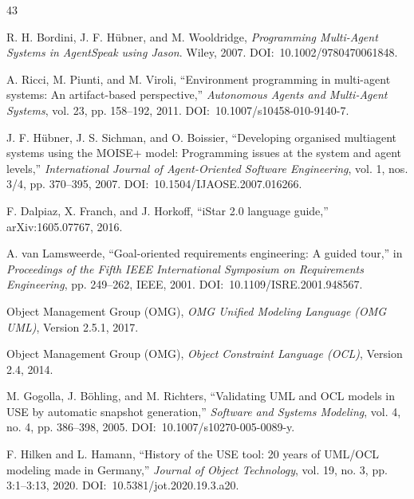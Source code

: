 \documentclass[12pt,a4paper,oneside]{extreport}
\begin{document}
\begin{thebibliography}{43}

R. H. Bordini, J. F. Hübner, and M. Wooldridge, \emph{Programming Multi-Agent Systems in AgentSpeak using Jason}. Wiley, 2007. \mbox{DOI: 10.1002/9780470061848}.


A. Ricci, M. Piunti, and M. Viroli, ``Environment programming in multi-agent systems: An artifact-based perspective,'' \emph{Autonomous Agents and Multi-Agent Systems}, vol. 23, pp. 158--192, 2011. \mbox{DOI: 10.1007/s10458-010-9140-7}.


J. F. Hübner, J. S. Sichman, and O. Boissier, ``Developing organised multiagent systems using the MOISE+ model: Programming issues at the system and agent levels,'' \emph{International Journal of Agent-Oriented Software Engineering}, vol. 1, nos. 3/4, pp. 370--395, 2007. \mbox{DOI: 10.1504/IJAOSE.2007.016266}.


F. Dalpiaz, X. Franch, and J. Horkoff, ``iStar 2.0 language guide,'' arXiv:1605.07767, 2016.


A. van Lamsweerde, ``Goal-oriented requirements engineering: A guided tour,'' in \emph{Proceedings of the Fifth IEEE International Symposium on Requirements Engineering}, pp. 249--262, IEEE, 2001. \mbox{DOI: 10.1109/ISRE.2001.948567}.


Object Management Group (OMG), \emph{OMG Unified Modeling Language (OMG UML)}, Version 2.5.1, 2017.


Object Management Group (OMG), \emph{Object Constraint Language (OCL)}, Version 2.4, 2014.


M. Gogolla, J. Böhling, and M. Richters, ``Validating UML and OCL models in USE by automatic snapshot generation,'' \emph{Software and Systems Modeling}, vol. 4, no. 4, pp. 386--398, 2005. \mbox{DOI: 10.1007/s10270-005-0089-y}.


F. Hilken and L. Hamann, ``History of the USE tool: 20 years of UML/OCL modeling made in Germany,'' \emph{Journal of Object Technology}, vol. 19, no. 3, pp. 3:1--3:13, 2020. \mbox{DOI: 10.5381/jot.2020.19.3.a20}.



\end{thebibliography}
\end{document}
